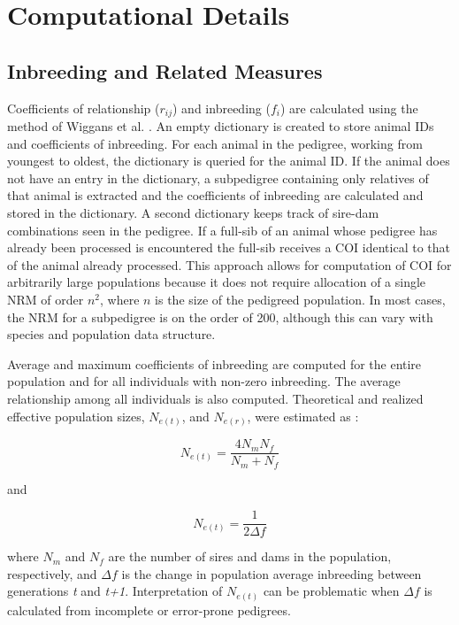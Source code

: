 \section{Computational Details}
\label{sec:methodology-computational-details}
\subsection{Inbreeding and Related Measures}
\label{sec:methodology-computation-inbreeding}
Coefficients of relationship ($r_{ij}$) and inbreeding ($f_{i}$) are calculated using the method of Wiggans et al. \citeyear{ref337}.  An empty dictionary is created to store animal IDs and coefficients of inbreeding.  For each animal in the pedigree, working from youngest to oldest, the dictionary is queried for the animal ID.  If the animal does not have an entry in the dictionary, a subpedigree containing only relatives of that animal is extracted and the coefficients of inbreeding are calculated and stored in the dictionary.  A second dictionary keeps track of sire-dam combinations seen in the pedigree.  If a full-sib of an animal whose pedigree has already been processed is encountered the full-sib receives a COI identical to that of the animal already processed.  This approach allows for computation of COI for arbitrarily large populations because it does not require allocation of a single NRM of order $n^{2}$, where $n$ is the size of the pedigreed population.  In most cases, the NRM for a subpedigree is on the order of 200, although this can vary with species and population data structure.

Average and maximum coefficients of inbreeding are computed for the entire population and for all individuals with non-zero inbreeding.  The average relationship among all individuals is also computed.  Theoretical and realized effective population
sizes, $N_{e(t)}$, and $N_{e(r)}$, were estimated as \cite{ref91}:

\[ N_{e(t)} = \dfrac{ 4 N_m N_f } { N_m + N_f } \]

and

\[ N_{e(t)} = \dfrac{1}{2 \Delta f} \]

where $N_m$ and $N_f$ are the number of sires and dams in the population, respectively, and $\Delta f$ is the change in
population average inbreeding between generations \textit{t} and \textit{t+1}.  Interpretation of $N_{e(t)}$ can be
problematic when $\Delta f$ is calculated from incomplete or error-prone pedigrees.

